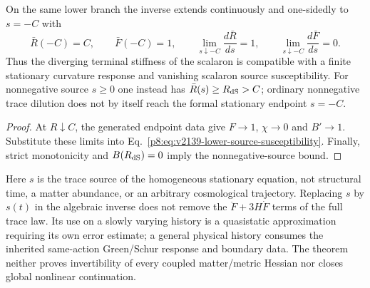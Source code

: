 \documentclass[12pt,a4paper]{article}
\begin{document}
\begin{corollary}
\label{p8:cor:v2139-terminal-source-susceptibility}
On the same lower branch the inverse extends continuously and one-sidedly to
$s=-C$ with
\[
 \bar R(-C)=C,\qquad \bar F(-C)=1,\qquad
 \lim_{s\downarrow-C}\frac{d\bar R}{ds}=1,\qquad
 \lim_{s\downarrow-C}\frac{d\bar F}{ds}=0.
\]
Thus the diverging terminal stiffness of the scalaron is compatible with a finite
stationary curvature response and vanishing scalaron source susceptibility.
For nonnegative source $s\ge0$ one instead has
$\bar R(s)\ge R_{\rm dS}>C$; ordinary nonnegative trace dilution does not by
itself reach the formal stationary endpoint $s=-C$.
\end{corollary}
\begin{proof}
At $R\downarrow C$, the generated endpoint data give $F\to1$,
$\chi\to0$ and $B'\to1$.  Substitute these limits into
Eq.~\eqref{p8:eq:v2139-lower-source-susceptibility}.  Finally, strict
monotonicity and $B(R_{\rm dS})=0$ imply the nonnegative-source bound.
\end{proof}

\begin{remark}
\label{p8:rem:v2139-stationary-source-domain}
Here $s$ is the trace source of the homogeneous stationary equation, not
structural time, a matter abundance, or an arbitrary cosmological trajectory.
Replacing $s$ by $s(t)$ in the algebraic inverse does not remove the
$\ddot F+3H\dot F$ terms of the full trace law.  Its use on a slowly varying
history is a quasistatic approximation requiring its own error estimate; a
general physical history consumes the inherited same-action Green/Schur
response and boundary data.  The theorem neither proves invertibility of
every coupled matter/metric Hessian nor closes global nonlinear continuation.
\end{remark}
\end{document}
